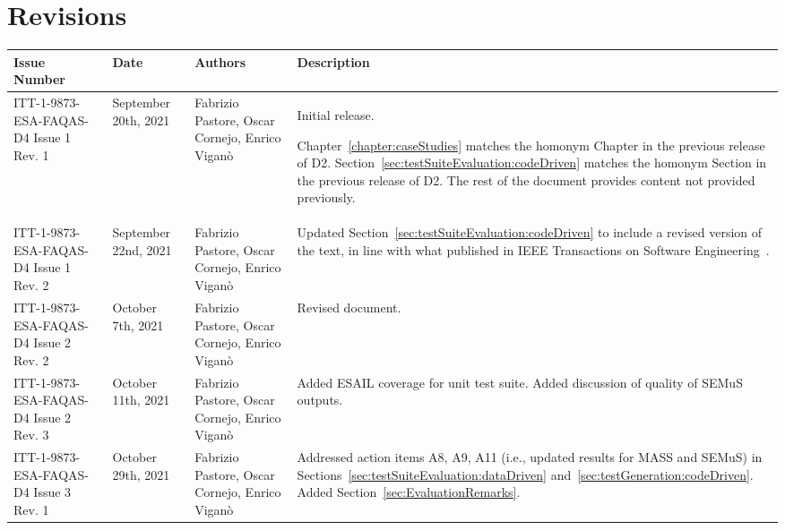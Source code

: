 
\section*{Revisions}
\label{sec:revisions}


\setlength\LTleft{0pt}
\setlength\LTright{0pt}
\tiny 
\begin{longtable}{|p{2cm}|p{1cm}|p{1.5cm}|p{9cm}|@{}}
\label{table:codeoperators} \\
\hline
\textbf{Issue Number}&\textbf{Date}&\textbf{Authors}&\textbf{Description}\\
\hline
ITT-1-9873-ESA-FAQAS-D4
Issue 1 Rev. 1&
September 20th, 2021&
Fabrizio Pastore, Oscar Cornejo, Enrico Viganò&
\begin{minipage}{8cm}
Initial release.

Chapter~\ref{chapter:caseStudies} matches the homonym Chapter in the previous release of D2.
Section~\ref{sec:testSuiteEvaluation:codeDriven} matches the homonym Section in the previous release of D2.
The rest of the document provides content not provided previously.
\end{minipage}
\\
\hline
ITT-1-9873-ESA-FAQAS-D4
Issue 1 Rev. 2&
September 22nd, 2021&
Fabrizio Pastore, Oscar Cornejo, Enrico Viganò&
\begin{minipage}{8cm}
Updated Section~\ref{sec:testSuiteEvaluation:codeDriven} to include a revised version of the text, in line with what published in IEEE Transactions on Software Engineering~\cite{Oscar:TSE}.
\end{minipage}
\\
\hline
ITT-1-9873-ESA-FAQAS-D4
Issue 2 Rev. 2&
October 7th, 2021&
Fabrizio Pastore, Oscar Cornejo, Enrico Viganò&
\begin{minipage}{8cm}
Revised document.
\end{minipage}
\\
\hline

ITT-1-9873-ESA-FAQAS-D4
Issue 2 Rev. 3&
October 11th, 2021&
Fabrizio Pastore, Oscar Cornejo, Enrico Viganò&
\begin{minipage}{8cm}
Added ESAIL coverage for unit test suite. Added discussion of quality of SEMuS outputs.
\end{minipage}
\\
\hline

ITT-1-9873-ESA-FAQAS-D4
Issue 3 Rev. 1&
October 29th, 2021&
Fabrizio Pastore, Oscar Cornejo, Enrico Viganò&
\begin{minipage}{8cm}
Addressed action items A8, A9, A11 (i.e., updated results for MASS and SEMuS) in Sections~\ref{sec:testSuiteEvaluation:dataDriven} and~\ref{sec:testGeneration:codeDriven}.
Added Section~\ref{sec:EvaluationRemarks}.
\end{minipage}
\\
\hline
                                                    
\end{longtable}
\normalsize

\clearpage
